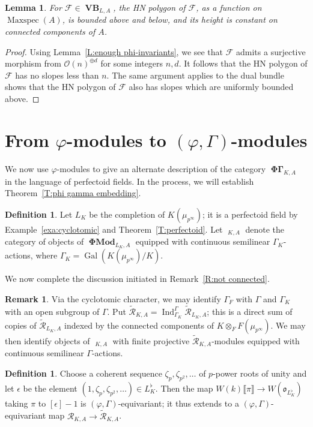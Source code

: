 \documentclass[12pt]{amsart}
\newtheorem{lemma}[theorem]{Lemma}
\theoremstyle{definition}
\newtheorem{defn}[theorem]{Definition}
\newtheorem{remark}[theorem]{Remark}
\numberwithin{equation}{theorem}
\newcommand{\calF}{\mathcal{F}}
\newcommand{\calO}{\mathcal{O}}
\newcommand{\calR}{\mathcal{R}}
\newcommand{\frako}{\mathfrak{o}}
\DeclareMathOperator{\Gal}{Gal}
\DeclareMathOperator{\Ind}{Ind}
\DeclareMathOperator{\Maxspec}{Maxspec}
\DeclareMathOperator{\PhiGamma}{\mathbf{\Phi \Gamma}}
\DeclareMathOperator{\PhiGammatilde}{\widetilde{\mathbf{\Phi \Gamma}}}
\DeclareMathOperator{\PhiMod}{\mathbf{\Phi Mod}}
\DeclareMathOperator{\VB}{\mathbf{VB}}
\begin{document}
\begin{lemma} \label{L:bounded slopes}
For $\calF \in \VB_{L,A}$, the HN polygon of $\calF$, as a function on $\Maxspec(A)$, is bounded above and below, and its height is constant on connected components of $A$.
\end{lemma}
\begin{proof}
Using Lemma~\ref{L:enough phi-invariants},
we see that $\calF$ admits a surjective morphism from $\calO(n)^{\oplus d}$ for some integers $n,d$. It follows that the HN polygon of $\calF$ has no slopes less than $n$.
The same argument applies to the dual bundle shows that the HN polygon of $\calF$ also has slopes which are uniformly bounded above.
\end{proof}
 

\section{From \texorpdfstring{$\varphi$}{phi}-modules to \texorpdfstring{$(\varphi, \Gamma)$}{(phi, Gamma)}-modules}
\label{sec:alternate}

We now use $\varphi$-modules to give an alternate description of the category $\PhiGamma_{K,A}$ in the language of perfectoid fields. In the process, we will establish Theorem~\ref{T:phi gamma embedding}.

\begin{defn}
Let $L_K$ be the completion of $K(\mu_{p^\infty})$; it is a perfectoid field by
Example~\ref{exa:cyclotomic} and Theorem~\ref{T:perfectoid}.
Let $\PhiGammatilde_{K,A}$ denote the category of objects of $\PhiMod_{L_K,A}$ equipped with continuous semilinear $\Gamma_K$-actions, where $\Gamma_K = \Gal(K(\mu_{p^\infty})/K)$.
\end{defn}

We now complete the discussion initiated in Remark~\ref{R:not connected}.
\begin{remark} \label{R:not connected2}
Via the cyclotomic character, we may identify $\Gamma_F$ with $\Gamma$ and $\Gamma_K$ with an open subgroup of $\Gamma$. Put $\tilde{\calR}_{K,A} = \Ind_{\Gamma_K}^\Gamma \tilde{\calR}_{L_K,A}$; this is a direct sum of copies of $\tilde{\calR}_{L_K,A}$ indexed by the connected components of $K \otimes_F F(\mu_{p^\infty})$. 
We may then identify objects of $\PhiGammatilde_{K,A}$ with finite projective
$\tilde{\calR}_{K,A}$-modules equipped with continuous semilinear $\Gamma$-actions.
\end{remark}

\begin{defn} \label{D:untilde to tilde map}
Choose a coherent sequence $\zeta_p, \zeta_{p^2}, \dots$ of $p$-power roots of unity
and let $\epsilon$ be the element $(1, \zeta_p, \zeta_{p^2}, \dots) \in L_K^{\flat}$.
Then the map $W(k) \llbracket \pi \rrbracket \to W(\frako_{L^\flat_K})$ taking $\pi$ to $[\epsilon]-1$
is $(\varphi, \Gamma)$-equivariant; it thus extends to a $(\varphi, \Gamma)$-equivariant map $\calR_{K,A} \to \tilde{\calR}_{K,A}$.
\end{defn}
\end{document}
